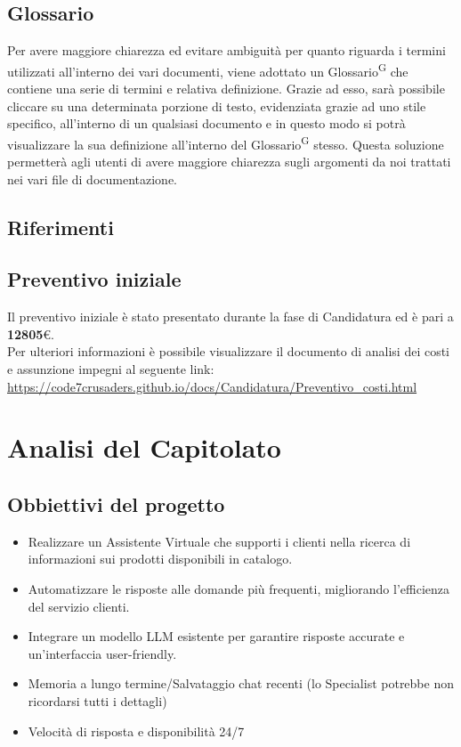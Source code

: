 \documentclass{article}
\begin{document}
    \subsection{Glossario}
    Per avere maggiore chiarezza ed evitare ambiguità per quanto riguarda i termini utilizzati all'interno dei vari documenti,
    viene adottato un Glossario\textsuperscript{G} che contiene una serie di termini e relativa definizione.
    Grazie ad esso, sarà possibile cliccare su una determinata porzione di testo, evidenziata grazie ad uno stile specifico,
    all'interno di un qualsiasi documento e in questo modo si potrà visualizzare la sua definizione all'interno
    del Glossario\textsuperscript{G} stesso. Questa soluzione permetterà agli utenti di avere maggiore chiarezza sugli argomenti da noi
    trattati nei vari file di documentazione.

    \subsection{Riferimenti}

    \subsection{Preventivo iniziale}
    Il preventivo iniziale è stato presentato durante la fase di Candidatura ed è pari a \textbf{12805}\euro.
    \\ Per ulteriori informazioni è possibile visualizzare il documento di analisi dei costi e assunzione impegni al seguente link:
    \\ \url{https://code7crusaders.github.io/docs/Candidatura/Preventivo_costi.html}




\newpage
\section{Analisi del Capitolato}
    \subsection{Obbiettivi del progetto}
    \begin{itemize}
        \item Realizzare un Assistente Virtuale che supporti i clienti nella ricerca
        di informazioni sui prodotti disponibili in catalogo.
        \item Automatizzare le risposte alle domande più frequenti, migliorando
        l'efficienza del servizio clienti.
        \item Integrare un modello LLM esistente per garantire risposte accurate e
        un'interfaccia user-friendly.
        \item Memoria a lungo termine/Salvataggio chat recenti (lo Specialist
        potrebbe non ricordarsi tutti i dettagli)
        \item Velocità di risposta e disponibilità 24/7
    \end{itemize}
\end{document}
